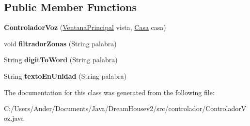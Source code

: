 \subsection*{Public Member Functions}
\begin{DoxyCompactItemize}
\item 
\mbox{\label{classcontrolador_1_1_controlador_voz_a6cda936ee3d81085740a81c018803bf7}} 
{\bfseries Controlador\+Voz} (\mbox{\hyperlink{classvista_1_1_ventana_principal}{Ventana\+Principal}} vista, \mbox{\hyperlink{classmodelo_1_1_casa}{Casa}} casa)
\item 
\mbox{\label{classcontrolador_1_1_controlador_voz_a77d8d66f1bbe3174d4df8a5c171cc4c5}} 
void {\bfseries filtrador\+Zonas} (String palabra)
\item 
\mbox{\label{classcontrolador_1_1_controlador_voz_a069bc1084f39b2c10a069731b353f6da}} 
String {\bfseries digit\+To\+Word} (String palabra)
\item 
\mbox{\label{classcontrolador_1_1_controlador_voz_a7a526053d4d5fce89ad3f9bd68f39ee1}} 
String {\bfseries texto\+En\+Unidad} (String palabra)
\end{DoxyCompactItemize}


The documentation for this class was generated from the following file\+:\begin{DoxyCompactItemize}
\item 
C\+:/\+Users/\+Ander/\+Documents/\+Java/\+Dream\+Housev2/src/controlador/Controlador\+Voz.\+java\end{DoxyCompactItemize}
